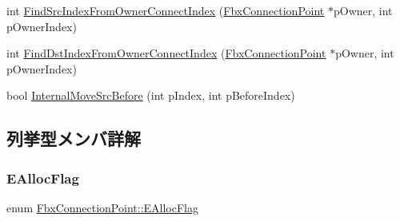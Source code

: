 \begin{DoxyCompactItemize}
\item 
int \hyperlink{class_fbx_connection_point_a5161119d009ab1ab080bd896f0d40346}{Find\+Src\+Index\+From\+Owner\+Connect\+Index} (\hyperlink{class_fbx_connection_point}{Fbx\+Connection\+Point} $\ast$p\+Owner, int p\+Owner\+Index)
\item 
int \hyperlink{class_fbx_connection_point_a6e597c9de1c85034ada54d94bca5a734}{Find\+Dst\+Index\+From\+Owner\+Connect\+Index} (\hyperlink{class_fbx_connection_point}{Fbx\+Connection\+Point} $\ast$p\+Owner, int p\+Owner\+Index)
\item 
bool \hyperlink{class_fbx_connection_point_a90bfb6707fe58f15cd81b9140dc2a8aa}{Internal\+Move\+Src\+Before} (int p\+Index, int p\+Before\+Index)
\end{DoxyCompactItemize}


\subsection{列挙型メンバ詳解}
\mbox{\label{class_fbx_connection_point_aab31d193025c9dacc8e95c63aae12531}} 
\subsubsection{\texorpdfstring{E\+Alloc\+Flag}{EAllocFlag}}
{\footnotesize\ttfamily enum \hyperlink{class_fbx_connection_point_aab31d193025c9dacc8e95c63aae12531}{Fbx\+Connection\+Point\+::\+E\+Alloc\+Flag}}

